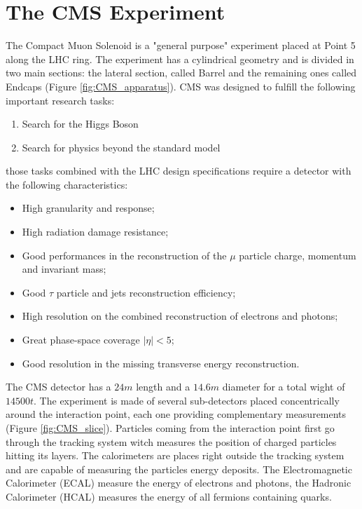 \clearpage

\section{The CMS Experiment}

The Compact Muon Solenoid is a "general purpose" experiment placed at Point 5 along the LHC ring. The experiment has a cylindrical geometry and is divided in two main sections: the lateral section, called Barrel and the remaining ones called Endcaps (Figure \ref{fig:CMS_apparatus}).   
CMS was designed to fulfill the following important research tasks:
\begin{enumerate}
	\item Search for the Higgs Boson
	\item Search for physics beyond the standard model
\end{enumerate}
those tasks combined with the LHC design specifications require a detector with the following characteristics:
\begin{itemize}
	\item High granularity and response;
	\item High radiation damage resistance;
	\item Good performances in the reconstruction of the $\mu$ particle charge, momentum and invariant mass;
	\item Good $\tau$ particle and jets reconstruction efficiency;
	\item High resolution on the combined reconstruction of electrons and photons;
	\item Great phase-space coverage $|\eta| < 5$;
	\item Good resolution in the missing transverse energy reconstruction.
\end{itemize} 

The CMS detector has a $24 m$ length and a $14.6 m$ diameter for a total wight of $14500 t$. The experiment is made of several sub-detectors placed concentrically around the interaction point, each one providing complementary measurements (Figure \ref{fig:CMS_slice}). Particles coming from the interaction point first go through the tracking system witch measures the position of charged particles hitting its layers. The calorimeters are places right outside the tracking system and are capable of measuring the particles energy deposits. The Electromagnetic Calorimeter (ECAL) measure the energy of electrons and photons, the Hadronic Calorimeter (HCAL) measures the energy of all fermions containing quarks.

